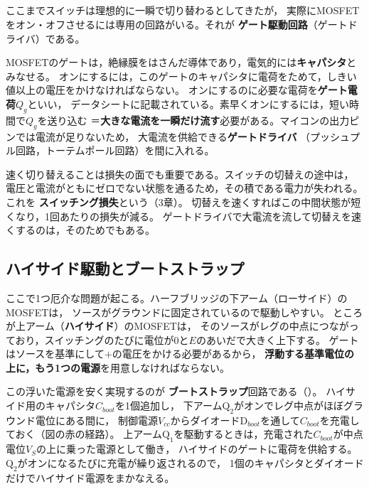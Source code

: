 \subsection{}

ここまでスイッチは理想的に一瞬で切り替わるとしてきたが，
実際にMOSFETをオン・オフさせるには専用の回路がいる。それが
\textbf{ゲート駆動回路}（ゲートドライバ）である。

MOSFETのゲートは，絶縁膜をはさんだ導体であり，電気的には\textbf{キャパシタ}とみなせる。
オンにするには，このゲートのキャパシタに電荷をためて，しきい値以上の電圧をかけなければならない。
オンにするのに必要な電荷を\textbf{ゲート電荷}$Q_g$といい，
データシートに記載されている。素早くオンにするには，短い時間で$Q_g$を送り込む
＝\textbf{大きな電流を一瞬だけ流す}必要がある。マイコンの出力ピンでは電流が足りないため，
大電流を供給できる\textbf{ゲートドライバ}
（プッシュプル回路，トーテムポール回路）を間に入れる。

速く切り替えることは損失の面でも重要である。スイッチの切替えの途中は，
電圧と電流がともにゼロでない状態を通るため，その積である電力が失われる。これを
\textbf{スイッチング損失}という（3章）。
切替えを速くすればこの中間状態が短くなり，1回あたりの損失が減る。
ゲートドライバで大電流を流して切替えを速くするのは，そのためでもある。

\subsection{ハイサイド駆動とブートストラップ}

ここで1つ厄介な問題が起こる。ハーフブリッジの下アーム（ローサイド）のMOSFETは，
ソースがグラウンドに固定されているので駆動しやすい。
ところが上アーム（\textbf{ハイサイド}）のMOSFETは，
そのソースがレグの中点につながっており，スイッチングのたびに電位が$0$と$E$のあいだで大きく上下する。
ゲートはソースを基準にして$+$の電圧をかける必要があるから，
\textbf{浮動する基準電位の上に，もう1つの電源}を用意しなければならない。

この浮いた電源を安く実現するのが
\textbf{ブートストラップ}回路である（）。
ハイサイド用のキャパシタ$C_{boot}$を1個追加し，
下アーム$\mathrm{Q}_2$がオンでレグ中点がほぼグラウンド電位にある間に，
制御電源$V_{cc}$からダイオード$\mathrm{D}_{boot}$を通して$C_{boot}$を充電しておく（図の赤の経路）。
上アーム$\mathrm{Q}_1$を駆動するときは，充電された$C_{boot}$が中点電位$V_S$の上に乗った電源として働き，
ハイサイドのゲートに電荷を供給する。$\mathrm{Q}_2$がオンになるたびに充電が繰り返されるので，
1個のキャパシタとダイオードだけでハイサイド電源をまかなえる。

